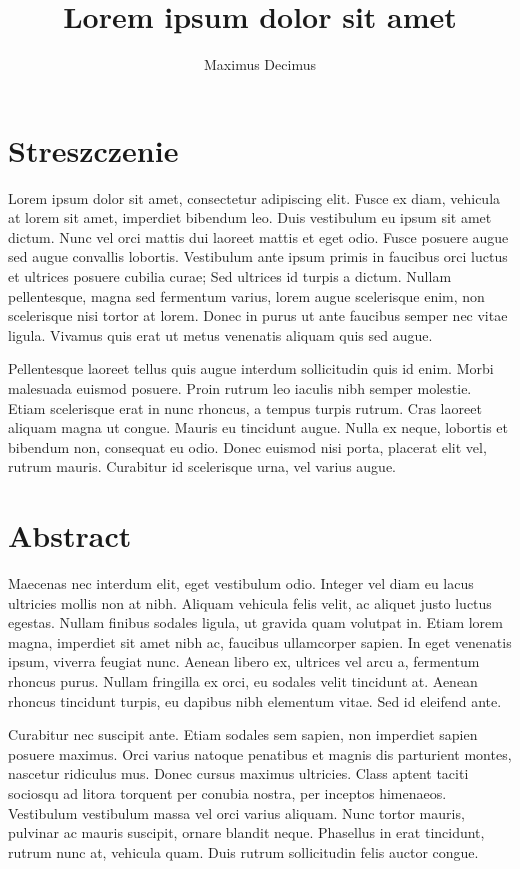 \documentclass[polish,engineering]{wizthesis}
\author{Maximus Decimus}
\title{Lorem ipsum dolor sit amet}
\begin{document}
\frontmatter %

\maketitle

\chapter*{Streszczenie}

Lorem ipsum dolor sit amet, consectetur adipiscing elit. Fusce ex diam, vehicula
at lorem sit amet, imperdiet bibendum leo. Duis vestibulum eu ipsum sit amet
dictum. Nunc vel orci mattis dui laoreet mattis et eget odio. Fusce posuere
augue sed augue convallis lobortis. Vestibulum ante ipsum primis in faucibus
orci luctus et ultrices posuere cubilia curae; Sed ultrices id turpis a dictum.
Nullam pellentesque, magna sed fermentum varius, lorem augue scelerisque enim,
non scelerisque nisi tortor at lorem. Donec in purus ut ante faucibus semper nec
vitae ligula. Vivamus quis erat ut metus venenatis aliquam quis sed augue.

Pellentesque laoreet tellus quis augue interdum sollicitudin quis id enim. Morbi
malesuada euismod posuere. Proin rutrum leo iaculis nibh semper molestie. Etiam
scelerisque erat in nunc rhoncus, a tempus turpis rutrum. Cras laoreet aliquam
magna ut congue. Mauris eu tincidunt augue. Nulla ex neque, lobortis et bibendum
non, consequat eu odio. Donec euismod nisi porta, placerat elit vel, rutrum
mauris. Curabitur id scelerisque urna, vel varius augue.

{\let\clearpage\relax %
\chapter*{Abstract}

Maecenas nec interdum elit, eget vestibulum odio. Integer vel diam eu lacus
ultricies mollis non at nibh. Aliquam vehicula felis velit, ac aliquet justo
luctus egestas. Nullam finibus sodales ligula, ut gravida quam volutpat in.
Etiam lorem magna, imperdiet sit amet nibh ac, faucibus ullamcorper sapien. In
eget venenatis ipsum, viverra feugiat nunc. Aenean libero ex, ultrices vel arcu
a, fermentum rhoncus purus. Nullam fringilla ex orci, eu sodales velit tincidunt
at. Aenean rhoncus tincidunt turpis, eu dapibus nibh elementum vitae. Sed id
eleifend ante.

Curabitur nec suscipit ante. Etiam sodales sem sapien, non imperdiet sapien
posuere maximus. Orci varius natoque penatibus et magnis dis parturient montes,
nascetur ridiculus mus. Donec cursus maximus ultricies. Class aptent taciti
sociosqu ad litora torquent per conubia nostra, per inceptos himenaeos.
Vestibulum vestibulum massa vel orci varius aliquam. Nunc tortor mauris,
pulvinar ac mauris suscipit, ornare blandit neque. Phasellus in erat tincidunt,
rutrum nunc at, vehicula quam. Duis rutrum sollicitudin felis auctor congue.
}
\end{document}
